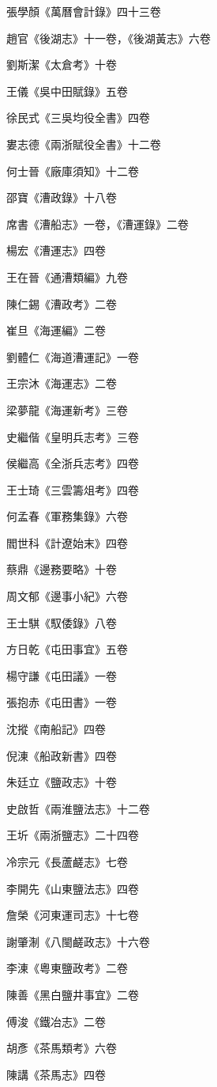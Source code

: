 張學顏《萬曆會計錄》四十三卷

趙官《後湖志》十一卷，《後湖黃志》六卷

劉斯潔《太倉考》十卷

王儀《吳中田賦錄》五卷

徐民式《三吳均役全書》四卷

婁志德《兩浙賦役全書》十二卷

何士晉《廠庫須知》十二卷

邵寶《漕政錄》十八卷

席書《漕船志》一卷，《漕運錄》二卷

楊宏《漕運志》四卷

王在晉《通漕類編》九卷

陳仁錫《漕政考》二卷

崔旦《海運編》二卷

劉體仁《海道漕運記》一卷

王宗沐《海運志》二卷

梁夢龍《海運新考》三卷

史繼偕《皇明兵志考》三卷

侯繼高《全浙兵志考》四卷

王士琦《三雲籌俎考》四卷

何孟春《軍務集錄》六卷

閻世科《計遼始末》四卷

蔡鼎《邊務要略》十卷

周文郁《邊事小紀》六卷

王士騏《馭倭錄》八卷

方日乾《屯田事宜》五卷

楊守謙《屯田議》一卷

張抱赤《屯田書》一卷

沈摐《南船記》四卷

倪涷《船政新書》四卷

朱廷立《鹽政志》十卷

史啟哲《兩淮鹽法志》十二卷

王圻《兩浙鹽志》二十四卷

冷宗元《長蘆鹺志》七卷

李開先《山東鹽法志》四卷

詹榮《河東運司志》十七卷

謝肇淛《八閩鹺政志》十六卷

李涷《粵東鹽政考》二卷

陳善《黑白鹽井事宜》二卷

傅浚《鐵冶志》二卷

胡彥《茶馬類考》六卷

陳講《茶馬志》四卷

